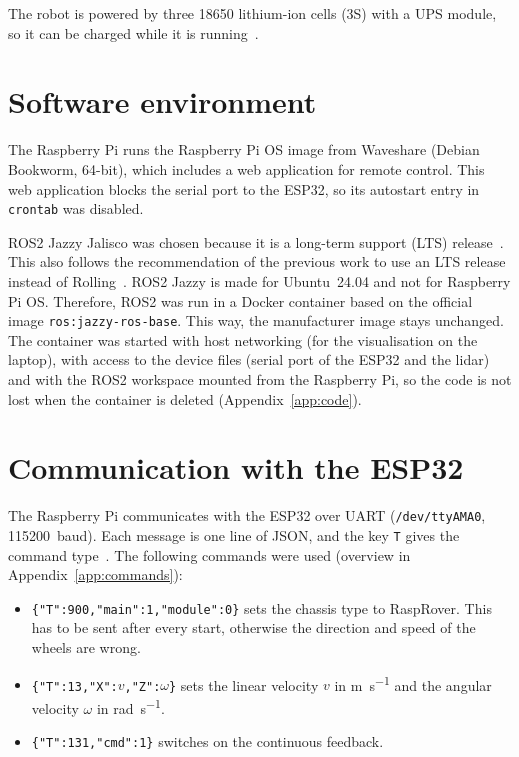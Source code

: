 The robot is powered by three 18650 lithium-ion cells (3S) with a UPS module, so it can be charged while it is running~\citep{waveshare_rasprover}.

\section{Software environment}
\label{sec:software}

The Raspberry Pi runs the Raspberry Pi OS image from Waveshare (Debian Bookworm, 64-bit), which includes a web application for remote control. This web application blocks the serial port to the ESP32, so its autostart entry in \texttt{crontab} was disabled.

ROS2 Jazzy Jalisco was chosen because it is a long-term support (LTS) release~\citep{ros2_jazzy}. This also follows the recommendation of the previous work to use an LTS release instead of Rolling~\citep{graham2024}. ROS2 Jazzy is made for Ubuntu~24.04 and not for Raspberry Pi OS. Therefore, ROS2 was run in a Docker container based on the official image \texttt{ros:jazzy-ros-base}. This way, the manufacturer image stays unchanged. The container was started with host networking (for the visualisation on the laptop), with access to the device files (serial port of the ESP32 and the lidar) and with the ROS2 workspace mounted from the Raspberry Pi, so the code is not lost when the container is deleted (Appendix~\ref{app:code}).

\section{Communication with the ESP32}
\label{sec:protocol}

The Raspberry Pi communicates with the ESP32 over UART (\texttt{/dev/ttyAMA0}, \SI{115200}{baud}). Each message is one line of JSON, and the key \texttt{T} gives the command type~\citep{waveshare_json}. The following commands were used (overview in Appendix~\ref{app:commands}):

\begin{itemize}
  \item \texttt{\{"T":900,"main":1,"module":0\}} sets the chassis type to RaspRover. This has to be sent after every start, otherwise the direction and speed of the wheels are wrong.
  \item \texttt{\{"T":13,"X":$v$,"Z":$\omega$\}} sets the linear velocity $v$ in \si{\metre\per\second} and the angular velocity $\omega$ in \si{\radian\per\second}.
  \item \texttt{\{"T":131,"cmd":1\}} switches on the continuous feedback.
\end{itemize}

